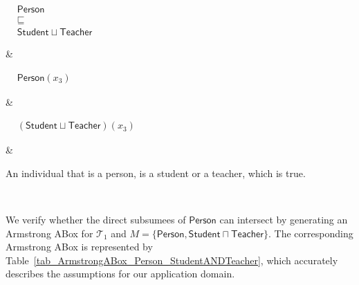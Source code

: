 \documentclass{amsart}
\newcommand\tableEntailmentSpacing{2.5cm}
\newcommand\tableExamplarSpacing{3.5cm}
\newcommand\tableCommentSpacing{4cm}
\begin{document}
\begin{table}
\begin{center}
\begin{tabular}
\begin{minipage}{\tableEntailmentSpacing}
        \vspace{2pt}
            $\begin{aligned}
              &\mathsf{Person}\\
  	      &\sqsubseteq\\
  	      &\mathsf{Student}  \sqcup \mathsf{Teacher}
           \end{aligned}$
  	\end{minipage}
        &
        \begin{minipage}{\tableExamplarSpacing}
  	    $\begin{aligned}
               &\mathsf{Person}(x_3)
  	    \end{aligned}$
  	\end{minipage}
  	&
  	\begin{minipage}{\tableExamplarSpacing}
  	    \vspace{2pt}
  	   $\begin{aligned}
             &(\mathsf{Student}  \sqcup \mathsf{Teacher})(x_3)
  	    \end{aligned}$ 
  	\end{minipage}
        &
        \begin{minipage}{\tableCommentSpacing}
            \vspace{2pt}
            An individual that is a person, is a student or a teacher, which is true.
            \vspace{2pt}
        \end{minipage}         
        \\
        \hline 
        
       \end{tabular}
     \end{center}
     \normalsize
   \end{table}
 
 
 We verify whether the direct subsumees of $\mathsf{Person}$ can intersect by generating an Armstrong ABox for $\mathcal{T}_1$ and $M =\{\mathsf{Person}, \mathsf{Student} \sqcap \mathsf{Teacher}\}$. The corresponding Armstrong ABox is represented by Table~\ref{tab_ArmstrongABox_Person_StudentANDTeacher}, which accurately describes the assumptions for our application domain.
 
\end{document}
